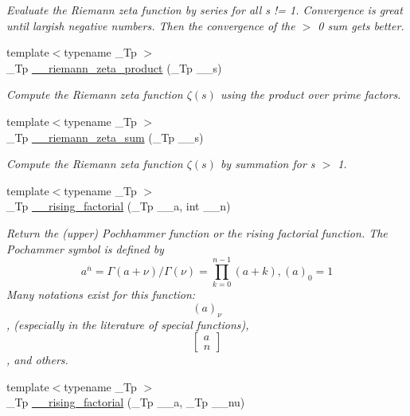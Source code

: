 \begin{DoxyCompactItemize}
\begin{DoxyCompactList}\small\item\em Evaluate the Riemann zeta function by series for all s != 1. Convergence is great until largish negative numbers. Then the convergence of the $>$ 0 sum gets better. \end{DoxyCompactList}\item 
{\footnotesize template$<$typename \+\_\+\+Tp $>$ }\\\+\_\+\+Tp \hyperlink{namespacestd_1_1____detail_a917935f42a21af90b78a19ea81349129}{\+\_\+\+\_\+riemann\+\_\+zeta\+\_\+product} (\+\_\+\+Tp \+\_\+\+\_\+s)
\begin{DoxyCompactList}\small\item\em Compute the Riemann zeta function $ \zeta(s) $ using the product over prime factors. \end{DoxyCompactList}\item 
{\footnotesize template$<$typename \+\_\+\+Tp $>$ }\\\+\_\+\+Tp \hyperlink{namespacestd_1_1____detail_a417dc216465f02bb7ef055fa0e4e1f0b}{\+\_\+\+\_\+riemann\+\_\+zeta\+\_\+sum} (\+\_\+\+Tp \+\_\+\+\_\+s)
\begin{DoxyCompactList}\small\item\em Compute the Riemann zeta function $ \zeta(s) $ by summation for s $>$ 1. \end{DoxyCompactList}\item 
{\footnotesize template$<$typename \+\_\+\+Tp $>$ }\\\+\_\+\+Tp \hyperlink{namespacestd_1_1____detail_a5a4c41ee568639f8de4508051da9954a}{\+\_\+\+\_\+rising\+\_\+factorial} (\+\_\+\+Tp \+\_\+\+\_\+a, int \+\_\+\+\_\+n)
\begin{DoxyCompactList}\small\item\em Return the (upper) Pochhammer function or the rising factorial function. The Pochammer symbol is defined by \[ a^{\overline{n}} = \Gamma(a + \nu) / \Gamma(\nu) = \prod_{k=0}^{n-1} (a + k), (a)_0 = 1 \] Many notations exist for this function\+: \[ (a)_\nu \], (especially in the literature of special functions), \[ \left[ \begin{array}{c} a \\ n \end{array} \right] \], and others. \end{DoxyCompactList}\item 
{\footnotesize template$<$typename \+\_\+\+Tp $>$ }\\\+\_\+\+Tp \hyperlink{namespacestd_1_1____detail_a109a13aa776d60bdc49b1cedc0e77670}{\+\_\+\+\_\+rising\+\_\+factorial} (\+\_\+\+Tp \+\_\+\+\_\+a, \+\_\+\+Tp \+\_\+\+\_\+nu)

\end{DoxyCompactItemize}
